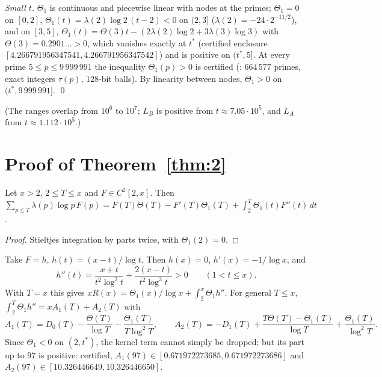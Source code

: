 \emph{Small $t$.} $\Theta_1$ is continuous and piecewise linear with nodes at the primes; $\Theta_1=0$ on $[0,2]$, $\Theta_1(t)=\lambda(2)\log2\,(t-2)<0$ on $(2,3]$ ($\lambda(2)=-24\cdot2^{-11/2}$), and on $[3,5]$, $\Theta_1(t)=\Theta(3)t-(2\lambda(2)\log2+3\lambda(3)\log3)$ with $\Theta(3)=0.2901\ldots>0$, which vanishes exactly at $t^*$ (certified enclosure $[4.266791956347541,4.266791956347542]$) and is positive on $(t^*,5]$. At every prime $5\le p\le9\,999\,991$ the inequality $\Theta_1(p)>0$ is certified (: $664\,577$ primes, exact integers $\tau(p)$, $128$-bit balls). By linearity between nodes, $\Theta_1>0$ on $(t^*,9\,999\,991]$. \qed

(The ranges overlap from $10^6$ to $10^7$; $L_B$ is positive from $t\approx7.05\cdot10^5$, and $L_A$ from $t\approx1.112\cdot10^5$.)

\section{Proof of Theorem~\ref{thm:2}}\label{sec:proof2}

\begin{lemma}\label{lem:partial}
Let $x>2$, $2\le T\le x$ and $F\in C^2[2,x]$. Then $\sum_{p\le T}\lambda(p)\log p\,F(p)=F(T)\Theta(T)-F'(T)\Theta_1(T)+\int_2^T\Theta_1(t)F''(t)\,dt$.
\end{lemma}

\begin{proof}
Stieltjes integration by parts twice, with $\Theta_1(2)=0$.
\end{proof}

Take $F=h$, $h(t)=(x-t)/\log t$. Then $h(x)=0$, $h'(x)=-1/\log x$, and
\[
h''(t)=\frac{x+t}{t^2\log^2t}+\frac{2(x-t)}{t^2\log^3t}>0\qquad(1<t\le x).
\]
With $T=x$ this gives $xR(x)=\Theta_1(x)/\log x+\int_2^x\Theta_1h''$. For general $T\le x$, $\int_2^T\Theta_1h''=xA_1(T)+A_2(T)$ with
\[
A_1(T)=D_0(T)-\frac{\Theta(T)}{\log T}-\frac{\Theta_1(T)}{T\log^2T},\qquad A_2(T)=-D_1(T)+\frac{T\Theta(T)-\Theta_1(T)}{\log T}+\frac{\Theta_1(T)}{\log^2T}.
\]
Since $\Theta_1<0$ on $(2,t^*)$, the kernel term cannot simply be dropped; but its part up to $97$ is positive: certified, $A_1(97)\in[0.671972273685,0.671972273686]$ and $A_2(97)\in[10.326446649,10.326446650]$.

